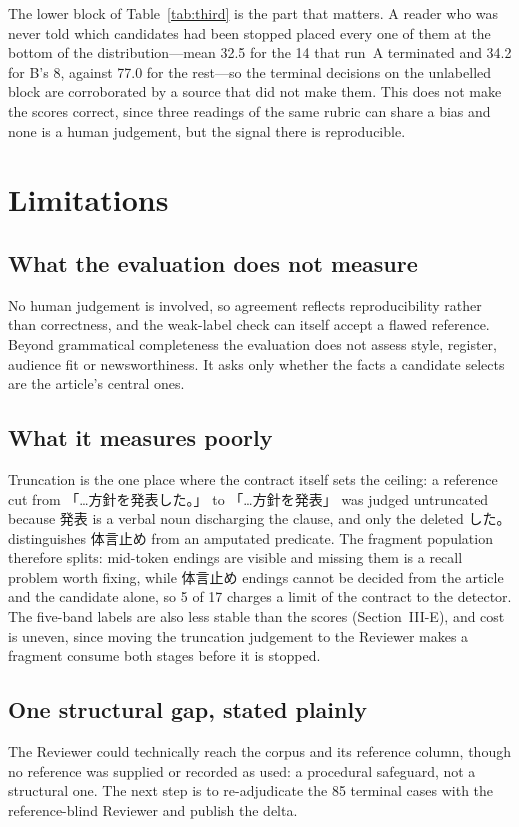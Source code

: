 \documentclass[conference]{IEEEtran}
\begin{document}
The lower block of Table~\ref{tab:third} is the part that matters. A
reader who was never told which candidates had been stopped placed every
one of them at the bottom of the distribution---mean 32.5 for the 14 that
run~A terminated and 34.2 for B's 8, against 77.0 for the rest---so the
terminal decisions on the unlabelled block are corroborated by a source
that did not make them. This does not make the scores correct, since three
readings of the same rubric can share a bias and none is a human
judgement, but the signal there is reproducible.

\section{Limitations}

\subsection{What the evaluation does not measure}
No human judgement is involved, so agreement reflects reproducibility rather than correctness, and the weak-label check can itself accept a flawed reference. Beyond grammatical completeness the evaluation does not assess style, register, audience fit or newsworthiness. It asks only whether the facts a candidate selects are the article's central ones.

\subsection{What it measures poorly}
Truncation is the one place where the contract itself sets the ceiling: a
reference cut from
「…\mbox{方針を\mbox{発表}}した。」 to 「…\mbox{方針を\mbox{発表}}」 was judged
untruncated because \mbox{発表} is a verbal noun discharging the clause, and
only the deleted した。 distinguishes \mbox{体言止め} from an amputated
predicate. The fragment population therefore
splits: mid-token endings are visible and missing them is a recall problem
worth fixing, while \mbox{体言止め} endings cannot be decided from the
article and the candidate alone, so 5 of 17 charges a limit of the contract
to the detector.
The five-band labels are also less stable than the scores
(Section~III-E), and cost is uneven, since moving the truncation
judgement to the Reviewer makes a fragment consume both stages before it
is stopped.

\subsection{One structural gap, stated plainly}
The Reviewer could technically reach the corpus and its reference column, though no reference was supplied or recorded as used: a procedural safeguard, not a structural one. The next step is to re-adjudicate the 85 terminal cases with the reference-blind Reviewer and publish the delta.
\end{document}
